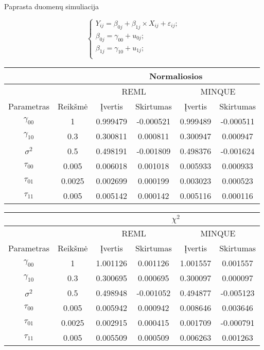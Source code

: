 \documentclass[12pt,a4paper]{article}
\begin{document}
Paprasta duomenų simuliacija

\begin{equation*}
\left\{
\begin{array}{l}
Y_{ij} = \beta_{0j}+\beta_{1j}\times X_{ij}+\varepsilon_{ij}; \\
\beta_{0j} = \gamma_{00} +u_{0j}; \\
\beta_{1j} = \gamma_{10} +u_{1j}; \\
\end{array} \right.
\end{equation*}

\begin{table}[ht]
\centering
\begin{tabular}{cccccc}
\hline
&& \multicolumn{4}{c}{Normaliosios}  \\
\hline
&& \multicolumn{2}{c}{REML} & \multicolumn{2}{c}{MINQUE}  \\
  \hline
Parametras& Reikšmė  & Įvertis & Skirtumas & Įvertis & Skirtumas  \\ 
  \hline
$\gamma_{00}$&1 & 0.999479 & -0.000521 & 0.999489 & -0.000511  \\ 
$\gamma_{10}$&0.3& 0.300811 & 0.000811 & 0.300947 & 0.000947  \\ 
 $\sigma^2$&0.5 & 0.498191 & -0.001809 & 0.498376 & -0.001624  \\ 
$\tau_{00}$&0.005 & 0.006018 & 0.001018 & 0.005933 & 0.000933  \\ 
 $\tau_{01}$&0.0025 & 0.002699 & 0.000199 & 0.003023 & 0.000523  \\ 
$ \tau_{11}$& 0.005 & 0.005142 & 0.000142 & 0.005116 & 0.000116  \\ 
   \hline
\end{tabular}
\begin{tabular}{cccccc}
\hline
&& \multicolumn{4}{c}{$\chi^2$} \\
\hline
&& \multicolumn{2}{c}{REML} & \multicolumn{2}{c}{MINQUE}  \\
  \hline
Parametras& Reikšmė  & Įvertis & Skirtumas & Įvertis & Skirtumas  \\ 
  \hline
$\gamma_{00}$&1  & 1.001126 & 0.001126 & 1.001557 & 0.001557 \\ 
$\gamma_{10}$&0.3 & 0.300695 & 0.000695 & 0.300097 & 0.000097 \\ 
 $\sigma^2$&0.5 & 0.498948 & -0.001052 & 0.494877 & -0.005123 \\ 
$\tau_{00}$&0.005  & 0.005942 & 0.000942 & 0.008646 & 0.003646 \\ 
 $\tau_{01}$&0.0025  & 0.002915 & 0.000415 & 0.001709 & -0.000791 \\ 
$ \tau_{11}$& 0.005  & 0.005509 & 0.000509 & 0.006263 & 0.001263 \\ 
   \hline
\end{tabular}
\end{table}
\end{document}
